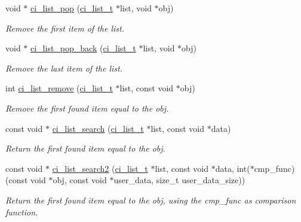 \begin{DoxyCompactItemize}
void $\ast$ \hyperlink{group__LISTS_gaa508f38d5d4ac019dbc7acbb6ad58e5a}{ci\_\-list\_\-pop} (\hyperlink{group__LISTS_ga785498c08d3d0440e1403146d0dfdb57}{ci\_\-list\_\-t} $\ast$list, void $\ast$obj)
\begin{DoxyCompactList}\small\item\em Remove the first item of the list. \item\end{DoxyCompactList}\item 
void $\ast$ \hyperlink{group__LISTS_ga522334a836ba93ab88cc9df691a59d4c}{ci\_\-list\_\-pop\_\-back} (\hyperlink{group__LISTS_ga785498c08d3d0440e1403146d0dfdb57}{ci\_\-list\_\-t} $\ast$list, void $\ast$obj)
\begin{DoxyCompactList}\small\item\em Remove the last item of the list. \item\end{DoxyCompactList}\item 
int \hyperlink{group__LISTS_ga9cfabc4ce1570206306c99e62e96c5f7}{ci\_\-list\_\-remove} (\hyperlink{group__LISTS_ga785498c08d3d0440e1403146d0dfdb57}{ci\_\-list\_\-t} $\ast$list, const void $\ast$obj)
\begin{DoxyCompactList}\small\item\em Remove the first found item equal to the obj. \item\end{DoxyCompactList}\item 
const void $\ast$ \hyperlink{group__LISTS_ga285029e6cfd7bc7c36601f40b8617e75}{ci\_\-list\_\-search} (\hyperlink{group__LISTS_ga785498c08d3d0440e1403146d0dfdb57}{ci\_\-list\_\-t} $\ast$list, const void $\ast$data)
\begin{DoxyCompactList}\small\item\em Return the first found item equal to the obj. \item\end{DoxyCompactList}\item 
const void $\ast$ \hyperlink{group__LISTS_ga80c99d3e99b256414bb53b14108168a0}{ci\_\-list\_\-search2} (\hyperlink{group__LISTS_ga785498c08d3d0440e1403146d0dfdb57}{ci\_\-list\_\-t} $\ast$list, const void $\ast$data, int($\ast$cmp\_\-func)(const void $\ast$obj, const void $\ast$user\_\-data, size\_\-t user\_\-data\_\-size))
\begin{DoxyCompactList}\small\item\em Return the first found item equal to the obj, using the cmp\_\-func as comparison function. \item\end{DoxyCompactList}\item 

\end{DoxyCompactItemize}
